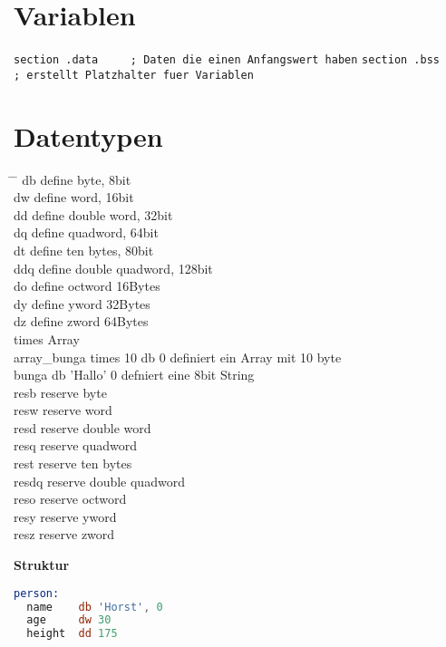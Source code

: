 \documentclass[a4paper,12pt,twoside]{article}
\begin{document}
\section{Variablen}
\verb|section .data     ; Daten die einen Anfangswert haben| 
\verb|section .bss      ; erstellt Platzhalter fuer Variablen| 
\section{Datentypen}
\begin{tabbing}
  \hspace{2mm} \= \hspace{50mm} \= \kill 
  \> db \> define byte, 8bit \\ 
  \> dw \> define word, 16bit \\ 
  \> dd \> define double word, 32bit \\ 
  \> dq \> define quadword, 64bit \\ 
  \> dt \> define ten bytes, 80bit \\ 
  \> ddq \> define double quadword, 128bit \\ 
  \> do \> define octword 16Bytes \\ 
  \> dy \> define yword 32Bytes \\ 
  \> dz \> define zword 64Bytes \\ 
  \> times \> Array \\
  \> array\_bunga times 10 db 0 \> definiert ein Array mit 10 byte \\  
  \> bunga db 'Hallo' 0 \> defniert eine 8bit String \\
  \> resb \> reserve byte \\ 
  \> resw \> reserve word \\ 
  \> resd \> reserve double word \\ 
  \> resq \> reserve quadword \\ 
  \> rest \> reserve ten bytes \\ 
  \> resdq \> reserve double quadword \\ 
  \> reso \> reserve octword \\ 
  \> resy \> reserve yword \\ 
  \> resz \> reserve zword \\ 
\end{tabbing}
\textbf{Struktur}
\begin{center}
\begin{minipage}{1.0\textwidth}
  \begin{lstlisting}[language=NASM]
person:
  name    db 'Horst', 0 
  age     dw 30 
  height  dd 175
  \end{lstlisting}
\end{minipage}
\end{center}
\end{document}

